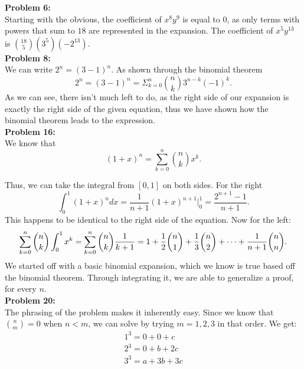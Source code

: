 \documentclass[12pt]{article}
\begin{document}
\noindent
\textbf{Problem 6: }\\

Starting with the obvious, the coefficient of $x^{8}y^{9}$ is equal to $0$,
as only terms with powers that sum to $18$ are represented in the expansion. 
The coefficient of $x^{5}y^{13}$ is  $\binom{18}{5}(3^{5})(-2^{13})$.\\

\noindent
\textbf{Problem 8: }\\

We can write $2^{n} = (3-1)^{n}$. As shown through the binomial theorem 
\[
	 2^n = (3-1)^{n} = \Sigma^{n}_{k=0}\binom{n}{k}3^{n-k}(-1)^{k} 
.\] 
As we can see, there isn't much left to do, as the right side of our expansion is exactly 
the right side of the given equation, thus we have shown how the binomial theorem leads to the expression. 
\\

\noindent
\textbf{Problem 16: } \\

We know that 
\[
	(1+x)^{n} = \sum^{n}_{k=0}\binom{n}{k}x^{k}
.\] 

Thus, we can take the integral from $[0, 1]$ on both sides. For the right
 \[
	 \int_{0}^{1} (1+x)^{n}dx = \frac{1}{n+1}(1+x)^{n+1}|^{1}_{0}
	 = \frac{2^{n+1} - 1}{n+1}
.\] 
This happens to be identical to the right side of the equation. Now for the left:
\[
	\sum^{n}_{k=0}\binom{n}{k}\int^{1}_{0}x^{k} = \sum^{n}_{k=0}\binom{n}{k}\frac{1}{k+1} \\
	= 1 + \frac{1}{2}\binom{n}{1} + \frac{1}{3}\binom{n}{2} + \cdots + \frac{1}{n+1}\binom{n}{n}
.\] 
We started off with a basic binomial expansion, which we know is true based off the binomial theorem.
Through integrating it, we are able to generalize a proof, for every $n$.\\

\noindent
\textbf{Problem 20: } \\

The phrasing of the problem makes it inherently easy. Since we know that $\binom{n}{m} = 0$ when $n < m$, we can solve by trying $m = 1, 2, 3$
in that order. We get: 
\begin{align}
	1^3 = 0 + 0 + c \\
	2^3 = 0 + b + 2c\\
	3^3 = a + 3b + 3c\\
\end{align}
\end{document}

